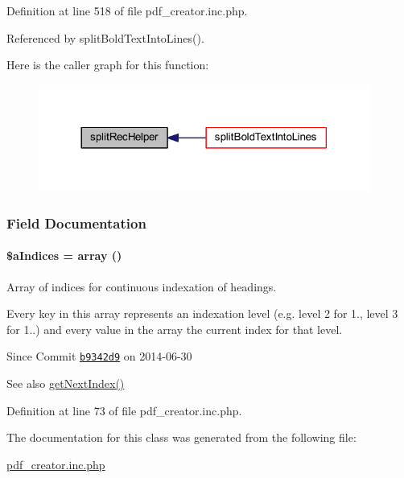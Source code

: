 Definition at line 518 of file pdf\+\_\+creator.\+inc.\+php.



Referenced by split\+Bold\+Text\+Into\+Lines().



Here is the caller graph for this function\+:
\nopagebreak
\begin{figure}[H]
\begin{center}
\leavevmode
\includegraphics[width=308pt]{classoverview_p_d_f_af3f9a49de14251ba45bd046879f27aa2_icgraph}
\end{center}
\end{figure}




\subsubsection{Field Documentation}
\hypertarget{classoverview_p_d_f_a7d055132da646af2b192923c6a864e97}{
\paragraph[{\$a\+Indices}]{\setlength{\rightskip}{0pt plus 5cm}\$a\+Indices = array ()\hspace{0.3cm}{\ttfamily [private]}}}\label{classoverview_p_d_f_a7d055132da646af2b192923c6a864e97}


Array of indices for continuous indexation of headings. 

Every key in this array represents an indexation level (e.\+g. level 2 for 1., level 3 for 1..) and every value in the array the current index for that level.

\begin{DoxySince}{Since}
Commit \href{http://github.com/TheJake123/DrupalModul/commit/b9342d941b3f93e212f3f6af0823a07524dd5954}{\tt b9342d9} on 2014-\/06-\/30 
\end{DoxySince}
\begin{DoxySeeAlso}{See also}
\hyperlink{classoverview_p_d_f_aedc9466cae51e07e57ba865a69c92efc}{get\+Next\+Index()} 
\end{DoxySeeAlso}


Definition at line 73 of file pdf\+\_\+creator.\+inc.\+php.



The documentation for this class was generated from the following file\+:\begin{DoxyCompactItemize}
\item 
\hyperlink{pdf__creator_8inc_8php}{pdf\+\_\+creator.\+inc.\+php}\end{DoxyCompactItemize}
